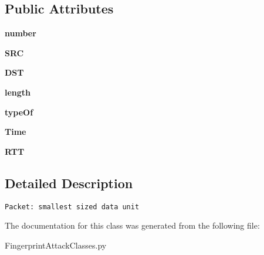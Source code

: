 \subsection*{Public Attributes}
\begin{CompactItemize}
\item 
\hypertarget{classFingerprintAttackClasses_1_1Packet_53620236d3442f66346d861fd268efcd}{
\textbf{number}}
\label{classFingerprintAttackClasses_1_1Packet_53620236d3442f66346d861fd268efcd}

\item 
\hypertarget{classFingerprintAttackClasses_1_1Packet_fc00caaf4b8c2114372c414caa8de188}{
\textbf{SRC}}
\label{classFingerprintAttackClasses_1_1Packet_fc00caaf4b8c2114372c414caa8de188}

\item 
\hypertarget{classFingerprintAttackClasses_1_1Packet_9a014184bb5a317397c3b62b48ccb044}{
\textbf{DST}}
\label{classFingerprintAttackClasses_1_1Packet_9a014184bb5a317397c3b62b48ccb044}

\item 
\hypertarget{classFingerprintAttackClasses_1_1Packet_64deb83ae6258f421be7d906350e9b32}{
\textbf{length}}
\label{classFingerprintAttackClasses_1_1Packet_64deb83ae6258f421be7d906350e9b32}

\item 
\hypertarget{classFingerprintAttackClasses_1_1Packet_4fff560a861dae2e70a15647fa590bc3}{
\textbf{typeOf}}
\label{classFingerprintAttackClasses_1_1Packet_4fff560a861dae2e70a15647fa590bc3}

\item 
\hypertarget{classFingerprintAttackClasses_1_1Packet_230833b27e603379eba6e0312f53372d}{
\textbf{Time}}
\label{classFingerprintAttackClasses_1_1Packet_230833b27e603379eba6e0312f53372d}

\item 
\hypertarget{classFingerprintAttackClasses_1_1Packet_e06b313b185f870ad5041640497ef3b1}{
\textbf{RTT}}
\label{classFingerprintAttackClasses_1_1Packet_e06b313b185f870ad5041640497ef3b1}

\end{CompactItemize}


\subsection{Detailed Description}


\footnotesize\begin{verbatim}Packet: smallest sized data unit\end{verbatim}
\normalsize
 

The documentation for this class was generated from the following file:\begin{CompactItemize}
\item 
FingerprintAttackClasses.py\end{CompactItemize}
